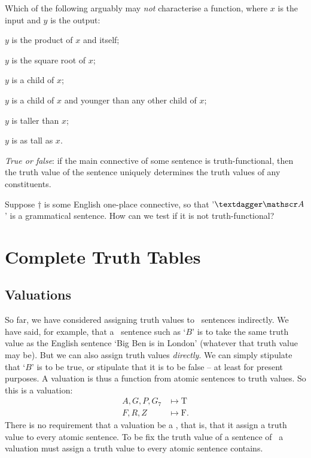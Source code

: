 \practiceproblems

\problempart Which of the following arguably may \emph{not} characterise a function, where $x$ is the input and $y$ is the output: \begin{earg}
	\item $y$ is the product of $x$ and itself;
	\item $y$ is the square root of $x$;
	\item $y$ is a child of $x$;
	\item $y$ is a child of $x$ and younger than any other child of $x$;
	\item $y$ is taller than $x$;
	\item $y$ is as tall as $x$. 
\end{earg}  
\problempart
\emph{True or false}: if the main connective of some sentence is truth-functional, then the truth value of the sentence uniquely determines the truth values of any constituents.

\problempart Suppose $†$ is some English one-place connective, so that '$†\meta{A}$' is a grammatical sentence. How can we test if it is not truth-functional?



\chapter{Complete Truth Tables}\label{s:CompleteTruthTables}

\section{Valuations}\label{s:valuations}

So far, we have considered assigning truth values to \TFL\ sentences indirectly. We have said, for example, that a \TFL\ sentence such as `$B$' is to take the same truth value as the English sentence `Big Ben is in London' (whatever that truth value may be). But we can also assign truth values \emph{directly}. We can simply stipulate that `$B$' is to be true, or stipulate that it is to be false – at least for present purposes. 
A valuation is thus a function from atomic sentences to truth values. So this is a valuation: \begin{align*}
	A, G, P, G_{7}  &\mapsto \mathrm{T}\\ 
	F, R, Z &\mapsto \mathrm{F}.
\end{align*} There is no requirement that a valuation be a , that is, that it assign a truth value to every atomic sentence. To be fix the truth value of a sentence  of \TFL\ a valuation must assign a truth value to every atomic sentence  contains.


